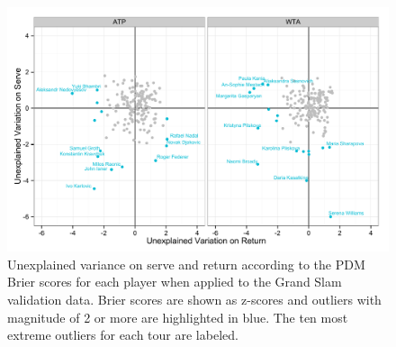 \documentclass{Latex/svjour3}
\begin{document}
\begin{figure}
\includegraphics[scale=0.9]{figs/player_volatility.pdf}
\caption{Unexplained variance on serve and return according to the PDM Brier
  scores for each player when applied to the Grand Slam validation data. Brier
  scores are shown as z-scores and outliers with magnitude of 2 or more are
  highlighted in blue. The ten most extreme outliers for each tour are labeled.}
\label{fig:volatility}
\end{figure}
\end{document}
